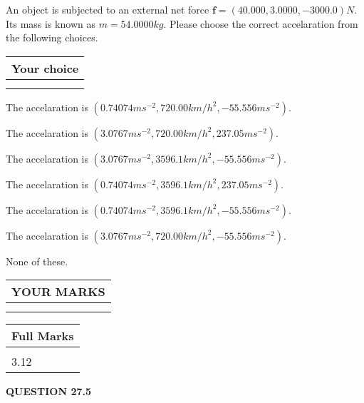 \documentclass[12pt]{article}
\begin{document}
  
 
An object is subjected to an external net force $\mathbf{f}=(
40.000 ,
3.0000,
-3000.0  )N$. Its mass is known as
$m= %
54.0000  kg$. Please choose the correct accelaration
from the following choices.
 
  
  
\noindent\hspace{3.0in} \begin{tabular}{|l|}
\hline
Your choice \\
\hline
 \\ 
 \\ 
\hline
\end{tabular}
  
  
 
 
The accelaration is
$(
0.74074ms^{-2},
720.00km/h^2,
-55.556ms^{-2}
).
$
 
 
The accelaration is
$(
3.0767ms^{-2},
720.00km/h^2,
237.05ms^{-2}
).
$
 
 
The accelaration is
$(
3.0767ms^{-2},
3596.1km/h^2,
-55.556ms^{-2}
).
$
 
 
The accelaration is
$(
0.74074ms^{-2},
3596.1km/h^2,
237.05ms^{-2}
).
$
 
 
The accelaration is
$(
0.74074ms^{-2},
3596.1km/h^2,
-55.556ms^{-2}
).
$
 
 
The accelaration is
$(
3.0767ms^{-2},
720.00km/h^2,
-55.556ms^{-2}
).
$
 
 
 None of these.
 
 
 
 

 
\vspace{0.3in}
  
\vspace{0.2in}
  
\noindent\begin{tabular}{|l|}
\hline
 YOUR MARKS  \\
\hline
 \\ 
 \\ 
\hline
\end{tabular}
\hspace{0.05in} \begin{tabular}{|l|}
\hline
 Full Marks  \\
\hline
 \\ 
3.12 \\
\hline
\end{tabular}
{\textbf{\Large{QUESTION
27.5 
}}}
  
\end{document}
